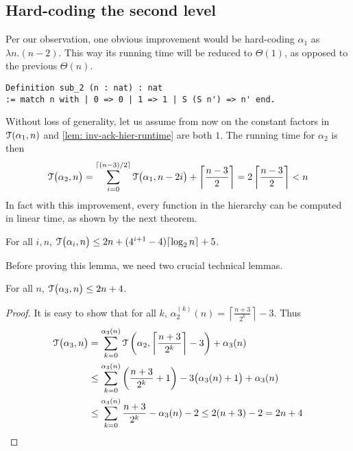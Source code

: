 \subsection{Hard-coding the second level}
Per our observation, one obvious improvement would be hard-coding $\alpha_1$ as $\lambda n.(n-2)$. This way its running time will be reduced to $\Theta(1)$, as opposed to the previous $\Theta(n)$.
\begin{lstlisting}
Definition sub_2 (n : nat) : nat
:= match n with | 0 => 0 | 1 => 1 | S (S n') => n' end.
\end{lstlisting}
Without loss of generality, let us assume from now on the constant factors in $\mathcal{T}(\alpha_1, n)$ and \cref{lem: inv-ack-hier-runtime} are both $1$. The running time for $\alpha_2$ is then
\begin{equation*}
\mathcal{T}\big(\alpha_2, n\big)
 = \sum_{i=0}^{\lceil (n-3)/2 \rceil} \mathcal{T} \big(\alpha_1, n-2i\big) + \left\lceil \frac{n-3}{2} \right\rceil =  2\left\lceil \frac{n-3}{2} \right\rceil
 < n 
\end{equation*}
In fact with this improvement, every function in the hierarchy can be computed in linear time, as shown by the next theorem.
\begin{thm} \label{thm: inv-ack-hier-runtime-improved}
	For all $i, n$, $\mathcal{T}\big(\alpha_i, n\big) \le 2n + (4^{i+1} - 4)\lceil \log_2n\rceil + 5$.
\end{thm}
Before proving this lemma, we need two crucial technical lemmas.
\begin{lem} \label{lem: inv-ack-3-runtime}
	For all $n$, $\mathcal{T}\big(\alpha_3, n\big) \le 2n + 4$.
\end{lem}
\begin{proof}
	It is easy to show that for all $k$, $\alpha_2^{(k)}(n) = \left\lceil \frac{n+3}{2^k} \right\rceil - 3$. Thus
	\begin{equation*}
	\begin{aligned}
	\mathcal{T}\big(\alpha_3, n\big) & =
	\sum_{k=0}^{\alpha_{3}(n)}\mathcal{T}\left(\alpha_2, \left\lceil \frac{n+3}{2^k} \right\rceil - 3\right) + \alpha_{3}(n) \\
	& \le \sum_{k=0}^{\alpha_3(n)}\left(\frac{n+3}{2^k} + 1\right) - 3\big(\alpha_3(n) + 1\big) + \alpha_3(n) \\
	& \le \sum_{k=0}^{\alpha_3(n)}\frac{n+3}{2^k} - \alpha_3(n) - 2 \le 2(n+3) - 2 = 2n + 4
	\end{aligned}
	\end{equation*}
\end{proof}
